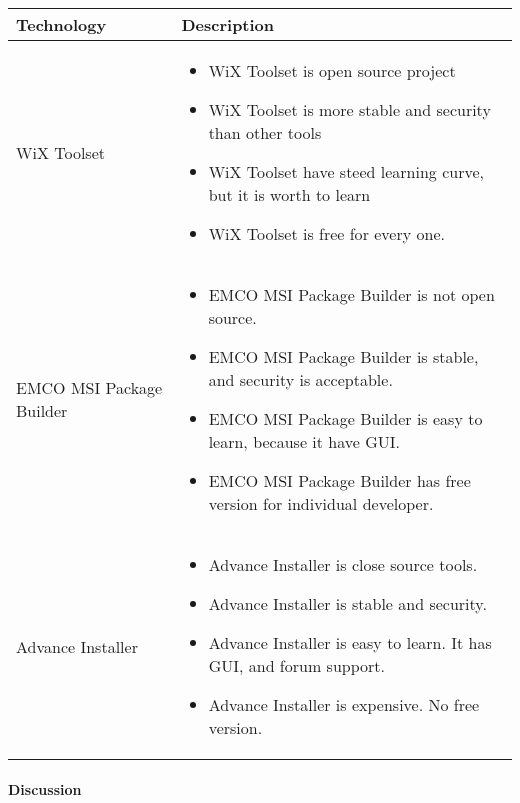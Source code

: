 \begin{center}
    \begin{tabular}{ | l | p{10cm} |}
    \hline
    Technology & Description  \\ \hline
    WiX Toolset \cite{Wix_tool} &
    \begin{itemize}
      \item WiX Toolset is open source project 
      \item WiX Toolset is more stable and security than other tools
      \item WiX Toolset have steed learning curve, but it is worth to learn
      \item WiX	Toolset is free for every one.
    \end{itemize}\\ \hline
    EMCO MSI Package Builder \cite{EMCO_MSI} &
    \begin{itemize}
      \item EMCO MSI Package Builder is not open source.
      \item EMCO MSI Package Builder is stable, and security is acceptable.
      \item EMCO MSI Package Builder is easy to learn, because it have GUI.
      \item EMCO MSI Package Builder has free version for individual developer.
    \end{itemize}\\ \hline
    Advance Installer \cite{advanced_install} &
    \begin{itemize}
      \item Advance Installer is close source tools.
      \item Advance Installer is stable and security.
      \item Advance Installer is easy to learn. It has GUI, and forum support.
      \item Advance Installer is expensive. No free version.
    \end{itemize}\\ \hline
    \end{tabular}
\end{center}

\paragraph{Discussion}


